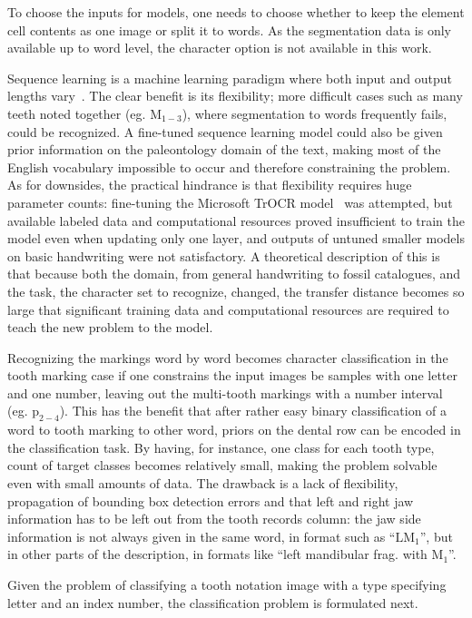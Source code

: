 \documentclass[english,twoside,openright]{UH_DS_MSc}
\begin{document}
To choose the inputs for models, one needs to choose whether to keep the
element cell contents as one image or split it to words. As the segmentation 
data is only available up to word level, the character option is not available in this work.

Sequence learning is a machine learning paradigm where both input and output lengths vary~\cite{sutskever2014sequence}.
The clear benefit is its flexibility; more difficult cases such as many teeth noted together (eg. $\text{M}_{1-3}$),
where segmentation to words frequently fails, could be recognized. A fine-tuned sequence learning 
model could also be given prior information on the paleontology domain of the text, making
most of the English vocabulary impossible to occur and therefore constraining the problem. As for downsides, the practical hindrance is 
that flexibility requires huge parameter counts: fine-tuning the 
Microsoft TrOCR model~\cite{li2021trocr} was attempted, but available labeled data and computational 
resources proved insufficient to train the model even when updating only one layer,
and outputs of untuned smaller models on basic handwriting were not satisfactory.
A theoretical description of this is that because both the domain, from general handwriting to fossil catalogues, 
and the task, the character set to recognize, changed, the transfer distance becomes so large 
that significant training data and computational resources are required to teach the new problem to the model.

Recognizing the markings word by word becomes character classification in 
the tooth marking case if one constrains the input images be samples with one letter and 
one number, leaving out the multi-tooth markings with a number interval (eg. $\text{p}_{2-4}$).
This has the benefit that after rather easy binary classification of a word to 
tooth marking to other word, priors on the dental row can be encoded in the classification
task. By having, for instance, one class for each tooth type, count of target classes becomes
relatively small, making the problem solvable even with small amounts of data.
The drawback is a lack of flexibility, propagation of 
bounding box detection errors and that left and right jaw information has to be left out from 
the tooth records column: the jaw side information is not always given in the same word, 
in format such as ``$\text{LM}_1$'', but in other parts of the description, in formats like
 ``left mandibular frag. with $\text{M}_1$''.

Given the problem of classifying a tooth notation image with a type specifying letter and an index 
number, the classification problem is formulated next.
\end{document}
